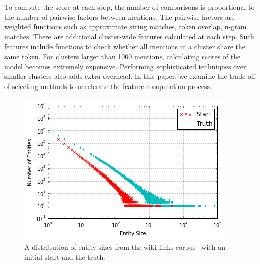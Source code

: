 To compute the score at each step, the number of comparisons is proportional to the number of pairwise factors between mentions.
The pairwise factors are weighted functions such as approximate string matches, token overlap, n-gram matches.
There are additional cluster-wide features calculated at each step.
Such features include functions to check whether all mentions in a cluster share the same token.
For clusters larger than 1000 mentions, calculating scores of the model becomes extremely expensive.
Performing sophisticated techniques over smaller clusters also adds extra overhead.
In this paper, we examine the trade-off of selecting methods to
accelerate the feature computation process.


\begin{figure}
\centering
\includegraphics[width=\columnwidth]{media/start-vs-nd.png}
\caption{A distribution of entity sizes from the wiki-links corpus~\cite{singh12:wiki-links} with an initial start and the truth.}
\label{fig:entity-distribution}
\end{figure}


